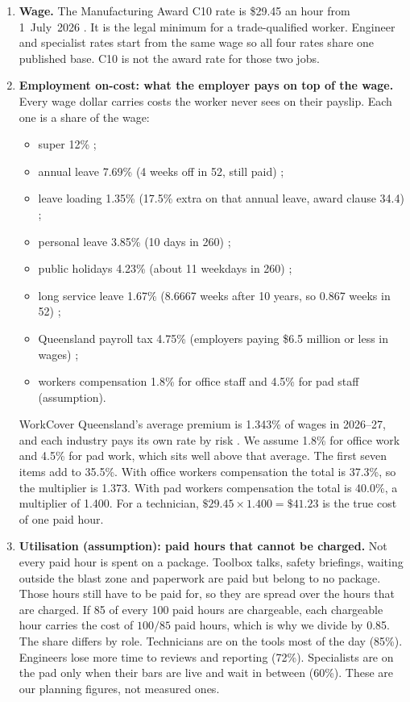 \begin{enumerate}[leftmargin=1.6em,itemsep=0.35em]
\item \textbf{Wage.} The Manufacturing Award C10 rate is \$29.45 an hour from 1~July~2026 \citep{fwc2026}. It is the legal minimum for a trade-qualified worker. Engineer and specialist rates start from the same wage so all four rates share one published base. C10 is not the award rate for those two jobs.

\item \textbf{Employment on-cost: what the employer pays on top of the wage.} Every wage dollar carries costs the worker never sees on their payslip. Each one is a share of the wage:
\begin{itemize}[leftmargin=1.2em,itemsep=0.1em]
\item super 12\% \citep{ato2025};
\item annual leave 7.69\% (4 weeks off in 52, still paid) \citep{fwa2009};
\item leave loading 1.35\% (17.5\% extra on that annual leave, award clause 34.4) \citep{fwc2026};
\item personal leave 3.85\% (10 days in 260) \citep{fwa2009};
\item public holidays 4.23\% (about 11 weekdays in 260) \citep{fwa2009,qholidays1983};
\item long service leave 1.67\% (8.6667 weeks after 10 years, so 0.867 weeks in 52) \citep{qira2016};
\item Queensland payroll tax 4.75\% (employers paying \$6.5 million or less in wages) \citep{qro2024};
\item workers compensation 1.8\% for office staff and 4.5\% for pad staff (assumption).
\end{itemize}
WorkCover Queensland's average premium is 1.343\% of wages in 2026--27, and each industry pays its own rate by risk \citep{workcover2026}. We assume 1.8\% for office work and 4.5\% for pad work, which sits well above that average. The first seven items add to 35.5\%. With office workers compensation the total is 37.3\%, so the multiplier is 1.373. With pad workers compensation the total is 40.0\%, a multiplier of 1.400. For a technician, $\$29.45 \times 1.400 = \$41.23$ is the true cost of one paid hour.

\item \textbf{Utilisation (assumption): paid hours that cannot be charged.} Not every paid hour is spent on a package. Toolbox talks, safety briefings, waiting outside the blast zone and paperwork are paid but belong to no package. Those hours still have to be paid for, so they are spread over the hours that are charged. If 85 of every 100 paid hours are chargeable, each chargeable hour carries the cost of $100/85$ paid hours, which is why we divide by 0.85. The share differs by role. Technicians are on the tools most of the day (85\%). Engineers lose more time to reviews and reporting (72\%). Specialists are on the pad only when their bars are live and wait in between (60\%). These are our planning figures, not measured ones.


\end{enumerate}
